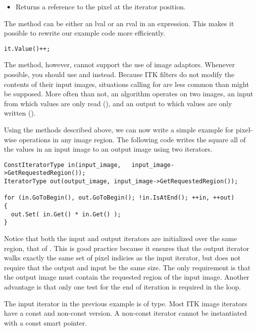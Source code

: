 \begin{itemize}
\item \textbf{} Returns a reference to the pixel at
the iterator position.
\end{itemize}

The  method can be either an lval or an rval in an expression.  This
makes it possible to rewrite our example code more efficiently.

\begin{verbatim}
it.Value()++;
\end{verbatim}

The  method, however, cannot support the use of image adaptors.
Whenever possible, you should use  and  instead.  Because
ITK filters do not modify the contents of their input images, situations
calling for  are less common than might be supposed.  More often
than not, an algorithm operates on two images, an input from which values are
only read (), and an output to which values are only written
().

Using the methods described above, we can now write a simple example for
pixel-wise operations in any image region.  The following code writes the
square all of the values in an input image to an output image using two
iterators.

\begin{verbatim}
ConstIteratorType in(input_image,   input_image->GetRequestedRegion());
IteratorType out(output_image, input_image->GetRequestedRegion());

for (in.GoToBegin(), out.GoToBegin(); !in.IsAtEnd(); ++in, ++out)
{
  out.Set( in.Get() * in.Get() );
}
\end{verbatim}

Notice that both the input and output iterators are initialized over the same
region, that of .  This is good practice because it ensures
that the output iterator walks exactly the same set of pixel indicies as the
input iterator, but does not require that the output and input be the same
size.  The only requirement is that the output image must contain the requested
region of the input image.  Another advantage is that only one test for the end
of iteration is required in the  loop.

The input iterator in the previous example is of  type.  Most ITK
image iterators have a const and non-const version.  A non-const iterator
cannot be instantiated with a const  smart pointer.

